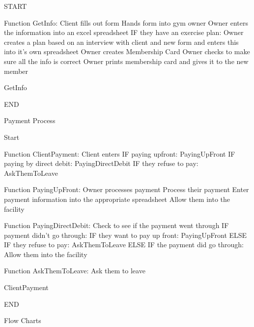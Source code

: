 \begin{python}

START

Function GetInfo:
	Client fills out form
	Hands form into gym owner
	Owner enters the information into an excel spreadsheet
	IF they have an exercise plan:
		Owner creates a plan based on an interview with client and new form and enters this into it’s
own spreadsheet
	Owner creates Membership Card
	Owner checks to make sure all the info is correct
	Owner prints membership card and gives it to the new member

GetInfo

END

\end{python}

Payment Process

\begin{python}
Start

Function ClientPayment:
	Client enters
	IF paying upfront:
		PayingUpFront
	IF paying by direct debit:
		PayingDirectDebit
	IF they refuse to pay:
		AskThemToLeave

Function PayingUpFront:
	Owner processes payment
	Process their payment
	Enter payment information into the appropriate spreadsheet
	Allow them into the facility

Function PayingDirectDebit:
	Check to see if the payment went through
	IF payment didn’t go through:
		IF they want to pay up front:
			PayingUpFront
		ELSE IF they refuse to pay:
			AskThemToLeave
	ELSE IF the payment did go through:
		Allow them into the facility

Function AskThemToLeave:
	Ask them to leave

ClientPayment 

END
\end{python}

Flow Charts

